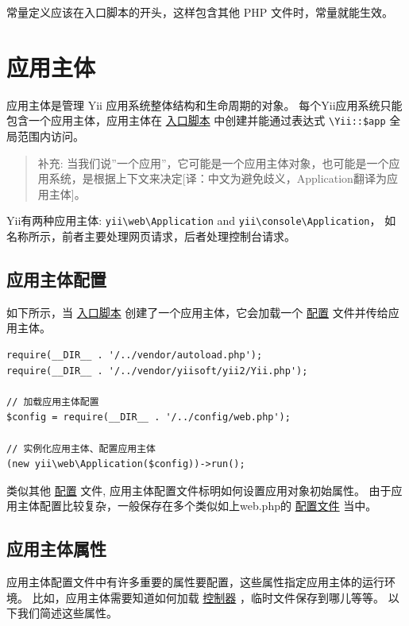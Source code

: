 常量定义应该在入口脚本的开头，这样包含其他 PHP 文件时，常量就能生效。



\label{structure-applications.md}\section{应用主体}
应用主体是管理 Yii 应用系统整体结构和生命周期的对象。
每个Yii应用系统只能包含一个应用主体，应用主体在 \hyperref[structure-entry-scripts.md]{入口脚本} 中创建并能通过表达式 \lstinline|\Yii::$app| 全局范围内访问。

\begin{quote}补充: 当我们说''一个应用''，它可能是一个应用主体对象，也可能是一个应用系统，是根据上下文来决定[译：中文为避免歧义，Application翻译为应用主体]。

\end{quote}
Yii有两种应用主体: \texttt{yii{\allowbreak{}\textbackslash}web{\allowbreak{}\textbackslash}Application} and
\texttt{yii{\allowbreak{}\textbackslash}console{\allowbreak{}\textbackslash}Application}， 如名称所示，前者主要处理网页请求，后者处理控制台请求。

\subsection{应用主体配置 \label{structure-applications.md::application-configurations}}
如下所示，当 \hyperref[structure-entry-scripts.md]{入口脚本} 创建了一个应用主体，它会加载一个 \hyperref[concept-configurations.md]{配置} 文件并传给应用主体。

\lstset{language=php}\begin{lstlisting}
require(__DIR__ . '/../vendor/autoload.php');
require(__DIR__ . '/../vendor/yiisoft/yii2/Yii.php');

// 加载应用主体配置
$config = require(__DIR__ . '/../config/web.php');

// 实例化应用主体、配置应用主体
(new yii\web\Application($config))->run();
\end{lstlisting}
类似其他 \hyperref[concept-configurations.md]{配置} 文件, 应用主体配置文件标明如何设置应用对象初始属性。
由于应用主体配置比较复杂，一般保存在多个类似如上web.php的 \hyperref[concept-configurations.md::configuration-files]{配置文件} 当中。

\subsection{应用主体属性 \label{structure-applications.md::application-properties}}
应用主体配置文件中有许多重要的属性要配置，这些属性指定应用主体的运行环境。
比如，应用主体需要知道如何加载 \hyperref[structure-controllers.md]{控制器} ，临时文件保存到哪儿等等。
以下我们简述这些属性。


